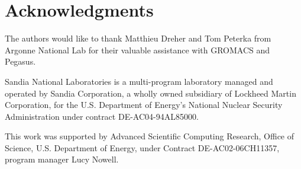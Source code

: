 \documentclass[conference]{IEEEtran}
\begin{document}

\maketitle












\section*{Acknowledgments}
The authors would like to thank Matthieu Dreher
and Tom Peterka from Argonne National Lab for their
valuable assistance with GROMACS and Pegasus.

Sandia National Laboratories is a multi-program laboratory managed and operated
by Sandia Corporation, a wholly owned subsidiary of Lockheed Martin
Corporation, for the U.S. Department of Energy's National Nuclear Security
Administration under contract DE-AC04-94AL85000.

This work was supported by Advanced Scientific Computing Research, Office of
Science, U.S. Department of Energy, under Contract DE-AC02-06CH11357, program
manager Lucy Nowell.




\vfill\eject
\end{document}
